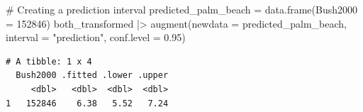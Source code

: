 \documentclass[
  letterpaper,
  DIV=11,
  numbers=noendperiod]{scrartcl}
\newenvironment{Shaded}{\begin{snugshade}}{\end{snugshade}}
\newcommand{\AttributeTok}[1]{\textcolor[rgb]{0.40,0.45,0.13}{#1}}
\newcommand{\CommentTok}[1]{\textcolor[rgb]{0.37,0.37,0.37}{#1}}
\newcommand{\DecValTok}[1]{\textcolor[rgb]{0.68,0.00,0.00}{#1}}
\newcommand{\FloatTok}[1]{\textcolor[rgb]{0.68,0.00,0.00}{#1}}
\newcommand{\FunctionTok}[1]{\textcolor[rgb]{0.28,0.35,0.67}{#1}}
\newcommand{\NormalTok}[1]{\textcolor[rgb]{0.00,0.23,0.31}{#1}}
\newcommand{\OtherTok}[1]{\textcolor[rgb]{0.00,0.23,0.31}{#1}}
\newcommand{\SpecialCharTok}[1]{\textcolor[rgb]{0.37,0.37,0.37}{#1}}
\newcommand{\StringTok}[1]{\textcolor[rgb]{0.13,0.47,0.30}{#1}}
\begin{document}
\begin{Shaded}
\begin{Highlighting}[]
\CommentTok{\# Creating a prediction interval}
\NormalTok{predicted\_palm\_beach }\OtherTok{=} \FunctionTok{data.frame}\NormalTok{(}\AttributeTok{Bush2000 =} \DecValTok{152846}\NormalTok{)}
\NormalTok{both\_transformed }\SpecialCharTok{|\textgreater{}} \FunctionTok{augment}\NormalTok{(}\AttributeTok{newdata =}\NormalTok{ predicted\_palm\_beach, }\AttributeTok{interval =} \StringTok{"prediction"}\NormalTok{, }\AttributeTok{conf.level =} \FloatTok{0.95}\NormalTok{)}
\end{Highlighting}
\end{Shaded}

\begin{verbatim}
# A tibble: 1 x 4
  Bush2000 .fitted .lower .upper
     <dbl>   <dbl>  <dbl>  <dbl>
1   152846    6.38   5.52   7.24
\end{verbatim}
\end{document}
